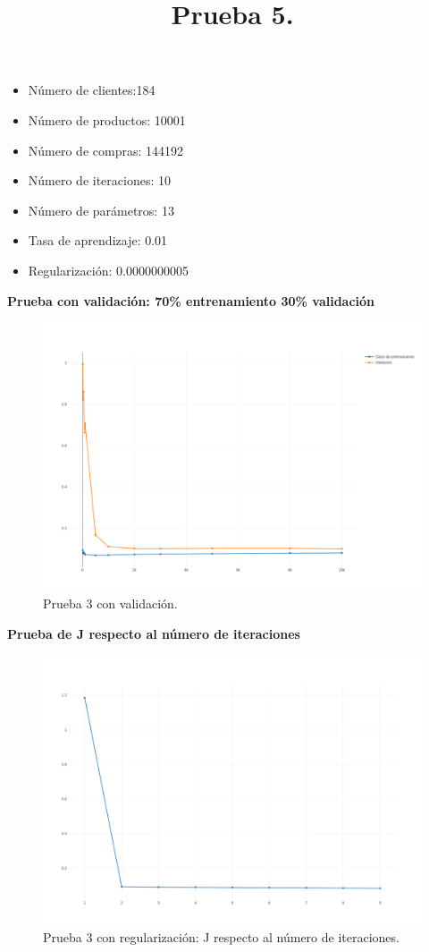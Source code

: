 {{{{{%
\title{\textbf{Prueba 5.}}

\begin{itemize}
\item Número de clientes:184
\item Número de productos: 10001
\item Número de compras: 144192
\item Número de iteraciones: 10
\item Número de parámetros: 13
\item Tasa de aprendizaje: 0.01
\item Regularización: 0.0000000005
\end{itemize}
\newpage
\textbf{Prueba con validación: 70\% entrenamiento 30\% validación}

\FloatBarrier
\begin{figure}[htbp!]
		\centering
			\includegraphics[width=1 \textwidth]{imagenes/pruebassistemarecom/10_0000000005_13}
		\caption{Prueba 3 con validación.}
		\label{gradiente_desc}
\end{figure}
\FloatBarrier
\newpage
\textbf{Prueba de J respecto al número de iteraciones}

\FloatBarrier
\begin{figure}[htbp!]
		\centering
			\includegraphics[width=1 \textwidth]{imagenes/pruebassistemarecom/2_5}
		\caption{Prueba 3 con regularización: J respecto al número de iteraciones.}
		\label{gradiente_desc}
\end{figure}
\FloatBarrier


}}}}}
